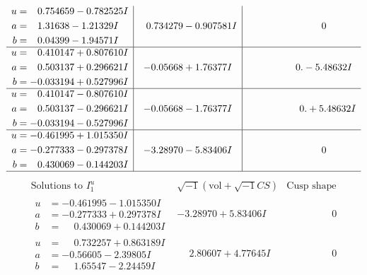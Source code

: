 \documentclass[1p]{elsarticle_modified}
\theoremstyle{definition}
\newcommand{\I}{\sqrt{-1}}
\begin{document}
$$\begin{array}{c|c|c}
\begin{aligned}
u &= \phantom{-}0.754659 - 0.782525 I \\
a &= \phantom{-}1.31638 - 1.21329 I \\
b &= \phantom{-}0.04399 - 1.94571 I\end{aligned}
 & \phantom{-}0.734279 - 0.907581 I & \phantom{-0.000000 } 0 \\ \hline\begin{aligned}
u &= \phantom{-}0.410147 + 0.807610 I \\
a &= \phantom{-}0.503137 + 0.296621 I \\
b &= -0.033194 + 0.527996 I\end{aligned}
 & -0.05668 + 1.76377 I & \phantom{-0.000000 } 0. - 5.48632 I \\ \hline\begin{aligned}
u &= \phantom{-}0.410147 - 0.807610 I \\
a &= \phantom{-}0.503137 - 0.296621 I \\
b &= -0.033194 - 0.527996 I\end{aligned}
 & -0.05668 - 1.76377 I & \phantom{-0.000000 -}0. + 5.48632 I \\ \hline\begin{aligned}
u &= -0.461995 + 1.015350 I \\
a &= -0.277333 - 0.297378 I \\
b &= \phantom{-}0.430069 - 0.144203 I\end{aligned}
 & -3.28970 - 5.83406 I & \phantom{-0.000000 } 0\\
 \hline 
 \end{array}$$\newpage$$\begin{array}{c|c|c}  
\text{Solutions to }I^u_{1}& \I (\text{vol} + \sqrt{-1}CS) & \text{Cusp shape}\\
 \hline 
\begin{aligned}
u &= -0.461995 - 1.015350 I \\
a &= -0.277333 + 0.297378 I \\
b &= \phantom{-}0.430069 + 0.144203 I\end{aligned}
 & -3.28970 + 5.83406 I & \phantom{-0.000000 } 0 \\ \hline\begin{aligned}
u &= \phantom{-}0.732257 + 0.863189 I \\
a &= -0.56605 - 2.39805 I \\
b &= \phantom{-}1.65547 - 2.24459 I\end{aligned}
 & \phantom{-}2.80607 + 4.77645 I & \phantom{-0.000000 } 0 \\ \hline\begin{aligned}

\end{aligned}
\end{array}$$
\end{document}

